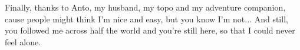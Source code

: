 \documentclass[letterpaper,12pt]{yalephd}
\begin{document}
Finally, thanks to Anto, my husband, my topo and my adventure companion, cause people might think I'm nice and easy, but you know I'm not... And still, you followed me across half the world and you're still here, so that I could never feel alone.



\mainmatter










\appendix










\backmatter


%
\end{document}
